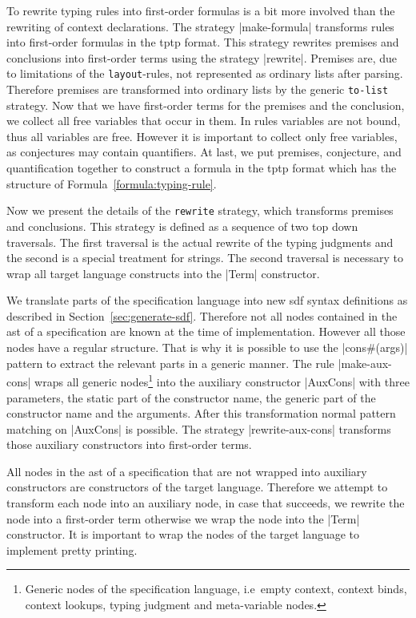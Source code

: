 To rewrite typing rules into first-order formulas is a bit more
involved than the rewriting of context declarations. The strategy
\code|make-formula| transforms rules into first-order formulas in the
\gls{tptp} format. This strategy rewrites premises and conclusions
into first-order terms using the strategy \code|rewrite|. Premises
are, due to limitations of the \texttt{layout}-rules, not represented
as ordinary lists after parsing. Therefore premises are transformed
into ordinary lists by the generic \texttt{to-list} strategy. Now that
we have first-order terms for the premises and the conclusion, we
collect all free variables that occur in them. In rules variables are
not bound, thus all variables are free. However it is important to
collect only free variables, as conjectures may contain
quantifiers. At last, we put premises, conjecture, and quantification
together to construct a formula in the \gls{tptp} format which has the
structure of Formula~\ref{formula:typing-rule}.

Now we present the details of the \texttt{rewrite} strategy, which
transforms premises and conclusions. This strategy is defined as a
sequence of two top down traversals. The first traversal is the actual
rewrite of the typing judgments and the second is a special treatment
for strings. The second traversal is necessary to wrap all target
language constructs into the \code|Term| constructor.

We translate parts of the specification language into new \gls{sdf}
syntax definitions as described in
Section~\ref{sec:generate-sdf}. Therefore not all nodes contained in
the \gls{ast} of a specification are known at the time of
implementation. However all those nodes have a regular structure. That
is why it is possible to use the \code|cons#(args)| pattern to extract
the relevant parts in a generic manner. The rule \code|make-aux-cons|
wraps all generic nodes\footnote{Generic nodes of the specification
  language, i.e\ empty context, context binds, context lookups,
  typing judgment and meta-variable nodes.} into the auxiliary
constructor \code|AuxCons| with three parameters, the static part of
the constructor name, the generic part of the constructor name and the
arguments. After this transformation normal pattern matching on
\code|AuxCons| is possible. The strategy \code|rewrite-aux-cons|
transforms those auxiliary constructors into first-order terms.

All nodes in the \gls{ast} of a specification that are not wrapped
into auxiliary constructors are constructors of the target
language. Therefore we attempt to transform each node into an
auxiliary node, in case that succeeds, we rewrite the node into a
first-order term otherwise we wrap the node into the \code|Term|
constructor. It is important to wrap the nodes of the target language
to implement pretty printing.

